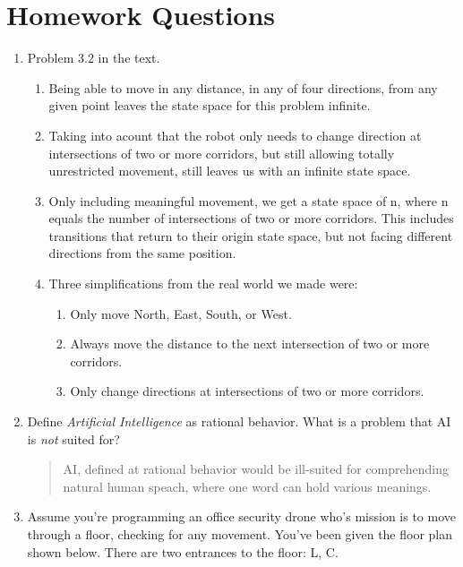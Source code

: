 \documentclass{article}
\begin{document}
\section*{Homework Questions}
\begin{enumerate}
\item Problem 3.2 in the text.
\begin{enumerate}
\item Being able to move in any distance, in any of four directions, from any given point leaves the state space for this problem infinite.
\item Taking into acount that the robot only needs to change direction at intersections of two or more corridors, but still allowing totally unrestricted movement, still leaves us with an infinite state space.
\item Only including meaningful movement, we get a state space of n, where n equals the number of intersections of two or more corridors. This includes transitions that return to their origin state space, but not facing different directions from the same position.
\item Three simplifications from the real world we made were:
\begin{enumerate}
\item Only move North, East, South, or West.
\item Always move the distance to the next intersection of two or more corridors.
\item Only change directions at intersections of two or more corridors.
\end{enumerate}
\end{enumerate}
\item Define {\it Artificial Intelligence} as rational behavior.  What is a problem that AI is {\it not} suited for?
\begin{quote}
AI, defined at rational behavior would be ill-suited for comprehending natural human speach, where one word can hold various meanings.
\end{quote}
\item Assume you're programming an office security drone who's mission is to move through a floor, checking for any movement.  You've been given the floor plan shown below.  There are two entrances to the floor: \textsf{L, C}.  
\begin{center}

\end{center}
\end{enumerate}
\end{document}
